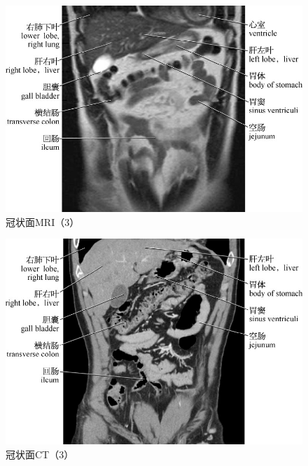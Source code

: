 \begin{figure}[!htbp]
 \centering
 \includegraphics{./images/Image00098.jpg}
 \captionsetup{justification=centering}
 \caption{冠状面MRI（3）}
  \end{figure} 
 \FloatBarrier

\begin{figure}[!htbp]
 \centering
 \includegraphics{./images/Image00099.jpg}
 \captionsetup{justification=centering}
 \caption{冠状面CT（3）}
  \end{figure} 
 \FloatBarrier

